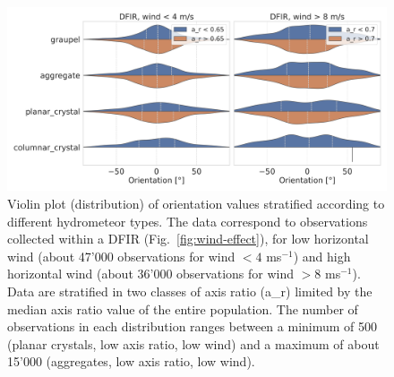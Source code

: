\documentclass[draft]{agujournal2019}
\begin{document}
 
\begin{figure}
 \noindent \centering \includegraphics[width=\textwidth]{Fig05.png}
\caption{Violin plot (distribution) of orientation values stratified according to different hydrometeor types. The data correspond to observations collected within a DFIR (Fig.~\ref{fig:wind-effect}), for low horizontal wind (about 47'000 observations for wind $<4$ ms$^{-1}$) and high horizontal wind (about 36'000 observations for wind $>8$ ms$^{-1}$). Data are stratified in two classes of axis ratio (a\_r) limited by the median axis ratio value of the entire population. The number of observations in each distribution ranges between a minimum of 500 (planar crystals, low axis ratio, low wind) and a maximum of about 15'000 (aggregates, low axis ratio, low wind).} 
\label{fig:hydroclass}
\end{figure}
\end{document}

